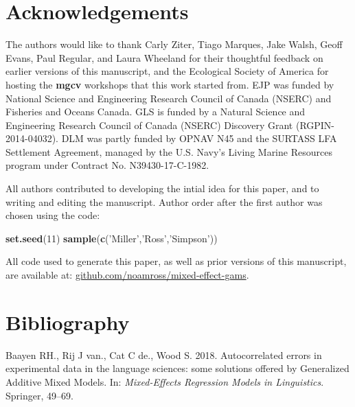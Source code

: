 \documentclass[12pt]{article}
\newenvironment{Shaded}{\begin{snugshade}}{\end{snugshade}}
\newcommand{\KeywordTok}[1]{\textcolor[rgb]{0.13,0.29,0.53}{\textbf{#1}}}
\newcommand{\DecValTok}[1]{\textcolor[rgb]{0.00,0.00,0.81}{#1}}
\newcommand{\StringTok}[1]{\textcolor[rgb]{0.31,0.60,0.02}{#1}}
\newcommand{\NormalTok}[1]{#1}
\begin{document}
\section{Acknowledgements}\label{acknowledgements}

The authors would like to thank Carly Ziter, Tiago Marques, Jake Walsh,
Geoff Evans, Paul Regular, and Laura Wheeland for their thoughtful
feedback on earlier versions of this manuscript, and the Ecological
Society of America for hosting the \textbf{mgcv} workshops that this
work started from. EJP was funded by National Science and Engineering
Research Council of Canada (NSERC) and Fisheries and Oceans Canada. GLS
is funded by a Natural Science and Engineering Research Council of
Canada (NSERC) Discovery Grant (RGPIN-2014-04032). DLM was partly funded
by OPNAV N45 and the SURTASS LFA Settlement Agreement, managed by the
U.S. Navy's Living Marine Resources program under Contract No.
N39430-17-C-1982.

All authors contributed to developing the intial idea for this paper,
and to writing and editing the manuscript. Author order after the first
author was chosen using the code:

\begin{Shaded}
\begin{Highlighting}[]
\KeywordTok{set.seed}\NormalTok{(}\DecValTok{11}\NormalTok{)}
\KeywordTok{sample}\NormalTok{(}\KeywordTok{c}\NormalTok{(}\StringTok{'Miller'}\NormalTok{,}\StringTok{'Ross'}\NormalTok{,}\StringTok{'Simpson'}\NormalTok{))}
\end{Highlighting}
\end{Shaded}

All code used to generate this paper, as well as prior versions of this
manuscript, are available at:
\href{https://github.com/noamross/mixed-effect-gams}{github.com/noamross/mixed-effect-gams}.

\FloatBarrier

\section*{Bibliography}\label{bibliography}

\hypertarget{refs}{}
\hypertarget{ref-baayen_autocorrelated_2018}{}
Baayen RH., Rij J van., Cat C de., Wood S. 2018. Autocorrelated errors
in experimental data in the language sciences: some solutions offered by
Generalized Additive Mixed Models. In: \emph{Mixed-Effects Regression
Models in Linguistics}. Springer, 49--69.
\end{document}
